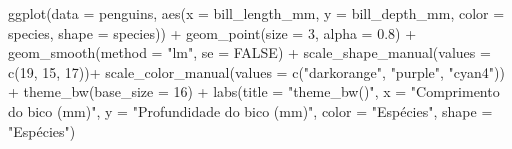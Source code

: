 \documentclass[
]{book}
\newenvironment{Shaded}{\begin{snugshade}}{\end{snugshade}}
\newcommand{\AttributeTok}[1]{\textcolor[rgb]{0.61,0.61,0.61}{#1}}
\newcommand{\ConstantTok}[1]{\textcolor[rgb]{0,0,0}{#1}}
\newcommand{\DecValTok}[1]{\textcolor[rgb]{0.06,0.06,0.06}{#1}}
\newcommand{\FloatTok}[1]{\textcolor[rgb]{0.06,0.06,0.06}{#1}}
\newcommand{\FunctionTok}[1]{\textcolor[rgb]{0,0,0}{#1}}
\newcommand{\NormalTok}[1]{#1}
\newcommand{\SpecialCharTok}[1]{\textcolor[rgb]{0,0,0}{#1}}
\newcommand{\StringTok}[1]{\textcolor[rgb]{0.5,0.5,0.5}{#1}}
\begin{document}
\begin{Shaded}
\begin{Highlighting}[]
\FunctionTok{ggplot}\NormalTok{(}\AttributeTok{data =}\NormalTok{ penguins, }
       \FunctionTok{aes}\NormalTok{(}\AttributeTok{x =}\NormalTok{ bill\_length\_mm, }
           \AttributeTok{y =}\NormalTok{ bill\_depth\_mm,}
           \AttributeTok{color =}\NormalTok{ species,}
           \AttributeTok{shape =}\NormalTok{ species)) }\SpecialCharTok{+}
  \FunctionTok{geom\_point}\NormalTok{(}\AttributeTok{size =} \DecValTok{3}\NormalTok{, }
             \AttributeTok{alpha =} \FloatTok{0.8}\NormalTok{) }\SpecialCharTok{+}
  \FunctionTok{geom\_smooth}\NormalTok{(}\AttributeTok{method =} \StringTok{"lm"}\NormalTok{, }\AttributeTok{se =} \ConstantTok{FALSE}\NormalTok{) }\SpecialCharTok{+}
  \FunctionTok{scale\_shape\_manual}\NormalTok{(}\AttributeTok{values =} \FunctionTok{c}\NormalTok{(}\DecValTok{19}\NormalTok{, }\DecValTok{15}\NormalTok{, }\DecValTok{17}\NormalTok{))}\SpecialCharTok{+}
  \FunctionTok{scale\_color\_manual}\NormalTok{(}\AttributeTok{values =} \FunctionTok{c}\NormalTok{(}\StringTok{"darkorange"}\NormalTok{, }\StringTok{"purple"}\NormalTok{, }\StringTok{"cyan4"}\NormalTok{)) }\SpecialCharTok{+}
  \FunctionTok{theme\_bw}\NormalTok{(}\AttributeTok{base\_size =} \DecValTok{16}\NormalTok{) }\SpecialCharTok{+}
  \FunctionTok{labs}\NormalTok{(}\AttributeTok{title =} \StringTok{"theme\_bw()"}\NormalTok{, }\AttributeTok{x =} \StringTok{"Comprimento do bico (mm)"}\NormalTok{, }\AttributeTok{y =} \StringTok{"Profundidade do bico (mm)"}\NormalTok{, }
       \AttributeTok{color =} \StringTok{"Espécies"}\NormalTok{, }\AttributeTok{shape =} \StringTok{"Espécies"}\NormalTok{) }
  


\end{Highlighting}
\end{Shaded}
\end{document}
